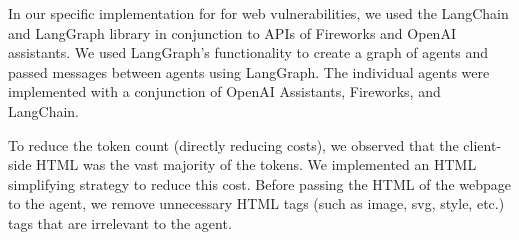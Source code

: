 In our specific implementation for \sn for web vulnerabilities, we used the
LangChain and LangGraph library in conjunction to APIs of Fireworks and OpenAI 
assistants. We used LangGraph's functionality to create a graph of agents and 
passed messages between agents using LangGraph. The individual agents were 
implemented with a conjunction of OpenAI Assistants, Fireworks, and LangChain.

To reduce the token count (directly reducing costs), we observed that the
client-side HTML was the vast majority of the tokens. We implemented an HTML
simplifying strategy to reduce this cost. Before passing the HTML of the webpage
to the agent, we remove unnecessary HTML tags (such as image, svg, style, etc.)
tags that are irrelevant to the agent.
